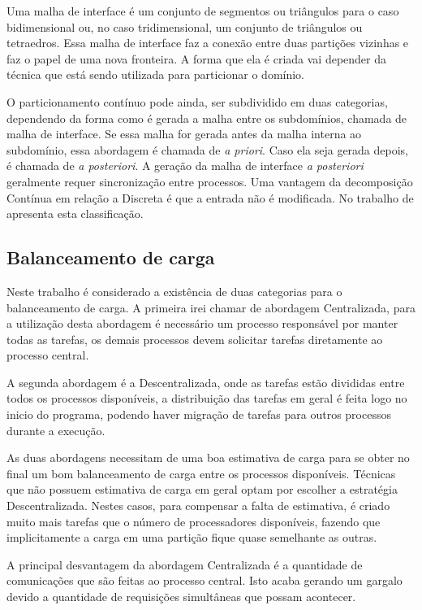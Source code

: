 Uma malha de interface é um conjunto de segmentos ou triângulos para o caso bidimensional ou, no caso tridimensional, um conjunto de triângulos ou tetraedros. Essa malha de interface faz a conexão entre duas partições vizinhas e faz o papel de uma nova fronteira. A forma que ela é criada vai depender da técnica que está sendo utilizada para particionar o domínio.

O particionamento contínuo pode ainda, ser subdividido em duas categorias, dependendo da forma como é gerada a malha entre os subdomínios, chamada de malha de interface. Se essa malha for gerada antes da malha interna ao subdomínio, essa abordagem é chamada de \textit{a priori}. Caso ela seja gerada depois, é chamada de \textit{a posteriori}. A geração da malha de interface \textit{a posteriori} geralmente requer sincronização entre processos. Uma vantagem da decomposição Contínua em relação a Discreta é que a entrada não é modificada. No trabalho de \cite{bib:deCougny99} apresenta esta classificação.
 
 
\subsection{Balanceamento de carga}
 
Neste trabalho é considerado a existência de duas categorias para o balanceamento de carga. A primeira irei chamar de abordagem Centralizada, para a utilização desta abordagem é necessário um processo responsável por manter todas as tarefas, os demais processos devem solicitar tarefas diretamente ao processo central.
 
A segunda abordagem é a Descentralizada, onde as tarefas estão divididas entre todos os processos disponíveis, a distribuição das tarefas em geral é feita logo no inicio do programa, podendo haver migração de tarefas para outros processos durante a execução.
 
As duas abordagens necessitam de uma boa estimativa de carga para se obter no final um bom balanceamento de carga entre os processos disponíveis. Técnicas que não possuem estimativa de carga em geral optam por escolher a estratégia Descentralizada. Nestes casos, para compensar a falta de estimativa, é criado muito mais tarefas que o número de processadores disponíveis, fazendo que implicitamente a carga em uma partição fique quase semelhante as outras.
 
A principal desvantagem da abordagem Centralizada é a quantidade de comunicações que são feitas ao processo central. Isto acaba gerando um gargalo devido a quantidade de requisições simultâneas que possam acontecer.
 
